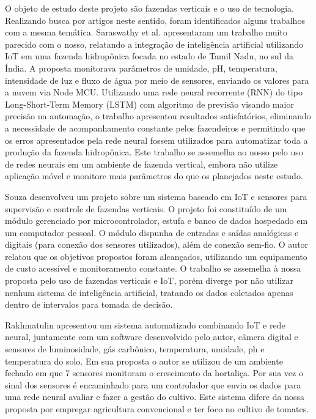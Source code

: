 O objeto de estudo deste projeto são fazendas verticais e o uso de tecnologia. Realizando busca por artigos neste sentido, foram identificados alguns trabalhos com a mesma temática. Saraswathy et al. \cite{saraswathy2020} apresentaram um trabalho muito parecido com o nosso, relatando a integração de inteligência artificial utilizando IoT em uma fazenda hidropônica focada no estado de Tamil Nadu, no sul da Índia. A proposta monitorava parâmetros de umidade, pH, temperatura, intensidade de luz e fluxo de água por meio de sensores, enviando os valores para a nuvem via Node MCU. Utilizando uma rede neural recorrente (RNN) do tipo Long-Short-Term Memory (LSTM) com algoritmo de previsão visando maior precisão na automação, o trabalho apresentou resultados satisfatórios, eliminando a necessidade de acompanhamento constante pelos fazendeiros e permitindo que os erros apresentados pela rede neural fossem utilizados para automatizar toda a produção da fazenda hidropônica. Este trabalho se assemelha ao nosso pelo uso de redes neurais em um ambiente de fazenda vertical, embora não utilize aplicação móvel e monitore mais parâmetros do que os planejados neste estudo.

Souza \citeyear{sousa2023} desenvolveu um projeto sobre um sistema baseado em IoT e sensores para supervisão e controle de fazendas verticais. O projeto foi constituído de um módulo gerenciado por microcontrolador, estufa e banco de dados hospedado em um computador pessoal. O módulo dispunha de entradas e saídas analógicas e digitais (para conexão dos sensores utilizados), além de conexão sem-fio. O autor relatou que os objetivos propostos foram alcançados, utilizando um equipamento de custo acessível e monitoramento constante. O trabalho se assemelha à nossa proposta pelo uso de fazendas verticais e IoT, porém diverge por não utilizar nenhum sistema de inteligência artificial, tratando os dados coletados apenas dentro de intervalos para tomada de decisão.

Rakhmatulin \cite{rakhmatulin2021} apresentou um sistema automatizado combinando IoT e rede neural, juntamente com um software desenvolvido pelo autor, câmera digital e sensores de luminosidade, gás carbônico, temperatura, umidade, ph e temperatura do solo. Em sua proposta o autor se utilizou de um ambiente fechado em que 7 sensores monitoram o crescimento da hortaliça. Por sua vez o sinal dos sensores é encaminhado para um controlador que envia os dados para uma rede neural avaliar e fazer a gestão do cultivo. Este sistema difere da nossa proposta por empregar agricultura convencional e ter foco no cultivo de tomates.

